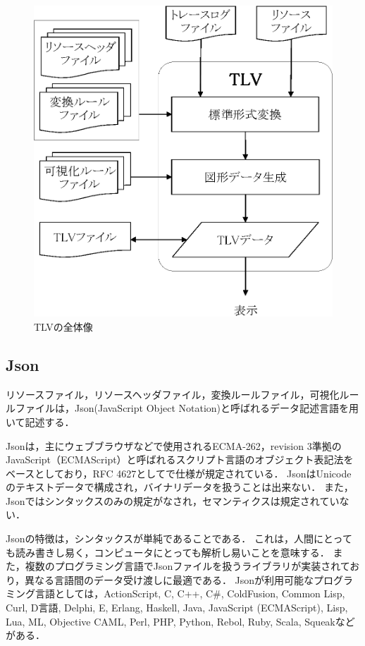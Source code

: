 \begin{figure}[!t]
\begin{center}
\includegraphics[scale=0.7]{img/tlv.eps}
\caption{TLVの全体像}
\label{fig:tlv}
\end{center}
\end{figure}

\subsection{Json}

リソースファイル，リソースヘッダファイル，変換ルールファイル，可視化ルールファイルは，Json(JavaScript Object Notation)\cite{Json}と呼ばれるデータ記述言語を用いて記述する．

Jsonは，主にウェブブラウザなどで使用されるECMA-262，revision 3準拠のJavaScript（ECMAScript）と呼ばれるスクリプト言語のオブジェクト表記法をベースとしており，RFC 4627としてで仕様が規定されている．
JsonはUnicodeのテキストデータで構成され，バイナリデータを扱うことは出来ない．
また，Jsonではシンタックスのみの規定がなされ，セマンティクスは規定されていない．

Jsonの特徴は，シンタックスが単純であることである．
これは，人間にとっても読み書きし易く，コンピュータにとっても解析し易いことを意味する．
また，複数のプログラミング言語でJsonファイルを扱うライブラリが実装されており，異なる言語間のデータ受け渡しに最適である．
Jsonが利用可能なプログラミング言語としては，ActionScript, C, C++, C\#, ColdFusion, Common Lisp, Curl, D言語, Delphi, E, Erlang, Haskell, Java, JavaScript (ECMAScript), Lisp, Lua, ML, Objective CAML, Perl, PHP, Python, Rebol, Ruby, Scala, Squeakなどがある．

